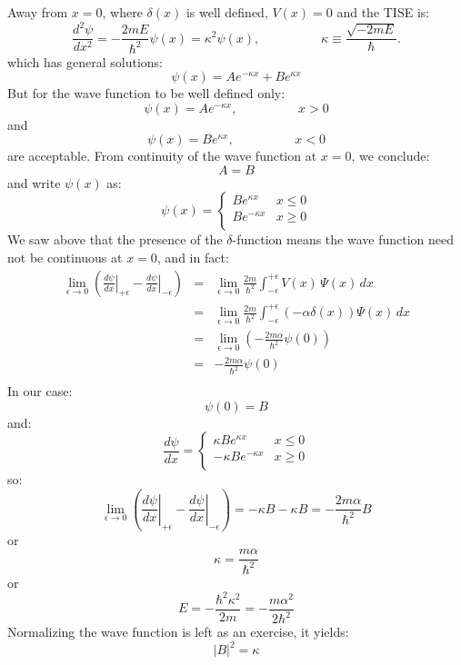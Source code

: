 \documentclass[12pt]{book}
\begin{document}
Away from $x=0$, where $\delta(x)$ is well defined, $V(x)=0$ and the TISE is:
\begin{equation*}
\frac{d^2 \psi}{d x^2} = -\frac{2mE}{\hbar^2}\psi(x) = \kappa^2 \psi(x), \hspace{2cm} \kappa \equiv \frac{\sqrt{-2mE}}{\hbar}.
\end{equation*}
which has general solutions:
$$\psi(x) = A e^{\displaystyle - \kappa x} + B e^{\displaystyle \kappa x}$$
But for the wave function to be well defined only:
$$\psi(x) = A e^{\displaystyle - \kappa x}, \hspace{2cm} x>0$$ 
and
$$\psi(x) = B e^{\displaystyle \kappa x}, \hspace{2cm} x<0$$
are acceptable.  From continuity of the wave function at $x=0$, we conclude:
$$A=B$$
and write $\psi(x)$ as:
$$\psi(x) = \begin{cases}
B e^{\displaystyle \kappa x} &  x\leq0 \\
B e^{\displaystyle -\kappa x} &  x\geq0 \\
\end{cases}
$$
We saw above that the presence of the $\delta$-function means the wave function need not be continuous at $x=0$, and in fact:
\begin{eqnarray*}
\lim_{\epsilon \to 0} \left( \left. \frac{d\psi}{d x} \right\rvert_{+\epsilon} 
- \left. \frac{d\psi}{d x} \right\rvert_{-\epsilon} \right) &=& 
\lim_{\epsilon \to 0}
\frac{2m}{\hbar^2}\int_{-\epsilon}^{+\epsilon} V(x) \, \Psi(x) \, dx \\
&=& 
\lim_{\epsilon \to 0}
\frac{2m}{\hbar^2}\int_{-\epsilon}^{+\epsilon} \left( -\alpha \delta(x) \right) \Psi(x)\, dx\\
&=& \lim_{\epsilon \to 0} \left( -\frac{2m\alpha}{\hbar^2} \psi(0) \right) \\
&=& -\frac{2m\alpha}{\hbar^2} \psi(0) \\ 
\end{eqnarray*}
In our case:
$$\psi(0) = B$$
and:
$$\frac{d\psi}{dx} = \begin{cases}
\kappa B e^{\displaystyle \kappa x} &  x\leq0 \\
-\kappa B e^{\displaystyle -\kappa x} &  x\geq0 \\
\end{cases}
$$
so:
$$
\lim_{\epsilon \to 0} \left( \left. \frac{d\psi}{d x} \right\rvert_{+\epsilon} 
- \left. \frac{d\psi}{d x} \right\rvert_{-\epsilon} \right) = -\kappa B - \kappa B = 
-\frac{2m\alpha}{\hbar^2} B 
$$
or
$$\kappa = \frac{m\alpha}{\hbar^2}$$
or
$$E = -\frac{\hbar^2 \kappa^2}{2m} = - \frac{m\alpha^2}{2\hbar^2}$$
Normalizing the wave function is left as an exercise, it yields:
$$|B|^2 = \kappa$$
\end{document}
